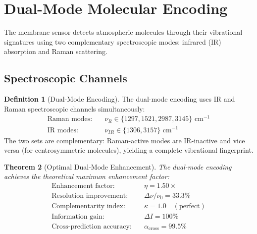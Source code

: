 \documentclass[12pt]{article}
\newtheorem{theorem}{Theorem}[section]
\theoremstyle{definition}
\newtheorem{definition}[theorem]{Definition}
\theoremstyle{remark}
\begin{document}
\section{Dual-Mode Molecular Encoding}
\label{sec:dual_mode}

The membrane sensor detects atmospheric molecules through their vibrational signatures using two complementary spectroscopic modes: infrared (IR) absorption and Raman scattering.

\subsection{Spectroscopic Channels}

\begin{definition}[Dual-Mode Encoding]
\label{def:dual_mode}
The dual-mode encoding uses IR and Raman spectroscopic channels simultaneously:
\begin{align}
\text{Raman modes:} &\quad \nu_R \in \{1297, 1521, 2987, 3145\} \text{ cm}^{-1} \label{eq:raman_modes} \\
\text{IR modes:} &\quad \nu_{IR} \in \{1306, 3157\} \text{ cm}^{-1} \label{eq:ir_modes}
\end{align}
The two sets are complementary: Raman-active modes are IR-inactive and vice versa (for centrosymmetric molecules), yielding a complete vibrational fingerprint.
\end{definition}

\begin{theorem}[Optimal Dual-Mode Enhancement]
\label{thm:enhancement}
The dual-mode encoding achieves the theoretical maximum enhancement factor:
\begin{align}
\text{Enhancement factor:} &\quad \eta = 1.50\times \label{eq:enhancement} \\
\text{Resolution improvement:} &\quad \Delta\nu/\nu_0 = 33.3\% \label{eq:resolution} \\
\text{Complementarity index:} &\quad \kappa = 1.0 \quad (\text{perfect}) \label{eq:complementarity} \\
\text{Information gain:} &\quad \Delta I = 100\% \label{eq:info_gain} \\
\text{Cross-prediction accuracy:} &\quad \alpha_{\mathrm{cross}} = 99.5\% \label{eq:cross_prediction}
\end{align}
\end{theorem}
\end{document}
